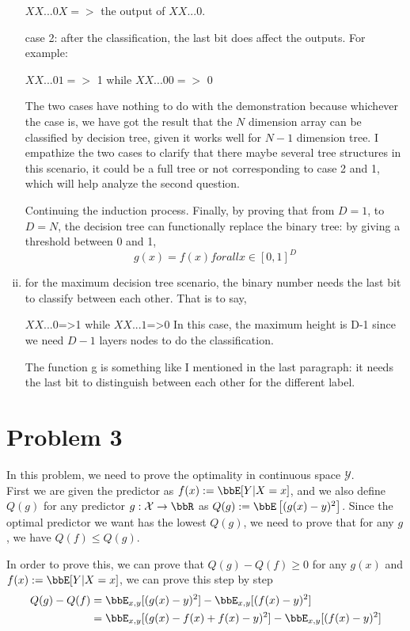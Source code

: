 \documentclass[twoside,11pt]{homework}
\begin{document}
\begin{enumerate}[(i)]
$XX...0X =>$ the output of $XX...0$. 

case 2: after the classification, the last bit does affect the outputs. For example:

$XX...01=>$ 1 while $XX...00=>$ 0

The two cases have nothing to do with the demonstration because whichever the case is, we have got the result that the $N$ dimension array can be classified by decision tree, given it works well for $N-1$ dimension tree. 
I empathize the two cases to clarify that there maybe several tree structures in this scenario, it could be a full tree or not corresponding to case 2 and 1, which will help analyze the second question.

Continuing the induction process. Finally, by proving that from $D=1$, to $D=N$, the decision tree can functionally replace the binary tree: by giving a threshold between 0 and 1, $$g(x) = f(x) for all x\in [0,1]^D$$
\item for the maximum decision tree scenario, the binary number needs the last bit to classify between each other. That is to say, 

$XX...0$=>1 while $XX...1$=>0
In this case, the maximum height is D-1 since we need $D-1$ layers nodes to do the classification.

The function g is something like I mentioned in the last paragraph: it needs the last bit to distinguish between each other for the different label.
\end{enumerate}


\section*{Problem 3}

In this problem, we need to prove the optimality in continuous space $\mathcal{Y}$.\\

First we are given the predictor as $f(x):=\bbE [Y|X=x]$, and we also define $Q(g)$ for any predictor $g:\mathcal{X} \to \bbR$ as $Q(g):=\bbE \left[(g(x)-y)^2\right]$. Since the optimal predictor we want has the lowest $Q(g)$, we need to prove that for any $g$, we have $Q(f)\leq Q(g)$.

In order to prove this, we can prove that $Q(g)-Q(f)\ge 0$ for any $g(x)$ and $f(x):=\bbE [Y|X=x]$, we can prove this step by step
\begin{align}
  Q(g)-Q(f)&=\bbE_{x,y} [(g(x)-y)^2]-\bbE_{x,y} [(f(x)-y)^2]
\\
  &=\bbE_{x,y} [(g(x)-f(x)+f(x)-y)^2]-\bbE_{x,y} [(f(x)-y)^2]
\end{align}
\end{document}
